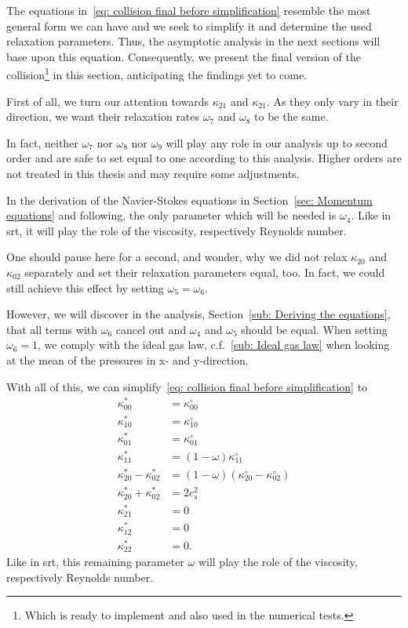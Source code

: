 The equations in~\eqref{eq: collision final before simplification} resemble the most general form we can have and we seek to simplify it and determine the used relaxation parameters.
Thus, the asymptotic analysis in the next sections will base upon this equation.
Consequently, we present the final version of the collision\footnote{Which is ready to implement and also used in the numerical tests.} in this section, anticipating the findings yet to come.

First of all, we turn our attention towards $\kappa_{21}$ and $\kappa_{21}$.
As they only vary in their direction, we want their relaxation rates $\omega_7$ and $\omega_8$ to be the same.

In fact, neither $\omega_7$ nor $\omega_8$ nor $\omega_9$ will play any role in our analysis up to second order and are safe to set equal to one according to this analysis.
Higher orders are not treated in this thesis and may require some adjustments.

In the derivation of the Navier-Stokes equations in Section~\ref{sec: Momentum equations} and following, the only parameter which will be needed is $\omega_4$.
Like in \gls{srt}, it will play the role of the viscosity, respectively Reynolds number.

One should pause here for a second, and wonder, why we did not relax $\kappa_{20}$ and $\kappa_{02}$ separately and set their relaxation parameters equal, too.
In fact, we could still achieve this effect by setting $\omega_5=\omega_6$.

However, we will discover in the analysis, Section~\ref{sub: Deriving the equations}, that all terms with $\omega_6$ cancel out and $\omega_4$ and $\omega_5$ should be equal.
When setting $\omega_6=1$, we comply with the ideal gas law, c.f.~\ref{sub: Ideal gas law} when looking at the mean of the pressures in x- and y-direction.

With all of this, we can simplify~\eqref{eq: collision final before simplification} to
\begin{equation}
  \label{eq: collision equation system full}
  \begin{aligned}
    \kappa_{00}^{*} & = \kappa_{00}^{\circ}\\
    \kappa_{10}^{*} & = \kappa_{10}^{\circ}\\
    \kappa_{01}^{*} & = \kappa_{01}^{\circ}\\
    \kappa_{11}^{*} & = (1-\omega)\kappa_{11}^{\circ}\\
    \kappa_{20}^{*} - \kappa_{02}^{*}
      & = (1-\omega) (\kappa_{20}^{\circ}- \kappa_{02}^{\circ}) \\
    \kappa_{20}^{*} + \kappa_{02}^{*}
      & = 2 c_s^2 \\
    \kappa_{21}^{*} & = 0 \\
    \kappa_{12}^{*} & = 0 \\
    \kappa_{22}^{*} & = 0.
  \end{aligned}
\end{equation}
Like in \gls{srt}, this remaining parameter $\omega$ will play the role of the viscosity, respectively Reynolds number.

